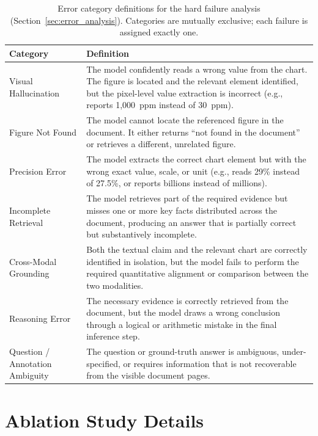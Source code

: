 \documentclass{article} %
\begin{document}
\begin{table}[htbp]
\centering
\footnotesize
\caption{%
  Error category definitions for the hard failure analysis
  (Section~\ref{sec:error_analysis}).
  Categories are mutually exclusive; each failure is assigned exactly one.
}
\label{tab:error_categories_app}
\begin{tabular}{@{}lp{9cm}@{}}
\toprule
\textbf{Category} & \textbf{Definition} \\
\midrule
Visual Hallucination &
  The model confidently reads a wrong value from the chart.
  The figure is located and the relevant element identified, but the
  pixel-level value extraction is incorrect (e.g., reports 1{,}000~ppm instead of 30~ppm). \\[4pt]
Figure Not Found &
  The model cannot locate the referenced figure in the document.
  It either returns ``not found in the document'' or retrieves a different, unrelated figure. \\[4pt]
Precision Error &
  The model extracts the correct chart element but with the wrong exact value, scale,
  or unit (e.g., reads 29\% instead of 27.5\%, or reports billions instead of millions). \\[4pt]
Incomplete Retrieval &
  The model retrieves part of the required evidence but misses one or more key facts
  distributed across the document, producing an answer that is partially correct but
  substantively incomplete. \\[4pt]
Cross-Modal Grounding &
  Both the textual claim and the relevant chart are correctly identified in isolation,
  but the model fails to perform the required quantitative alignment or comparison
  between the two modalities. \\[4pt]
Reasoning Error &
  The necessary evidence is correctly retrieved from the document, but the model draws
  a wrong conclusion through a logical or arithmetic mistake in the final inference step. \\[4pt]
Question / Annotation Ambiguity &
  The question or ground-truth answer is ambiguous, under-specified, or requires
  information that is not recoverable from the visible document pages. \\
\bottomrule
\end{tabular}
\end{table}

\FloatBarrier
\section{Ablation Study Details}
\label{app:ablation_details}
\end{document}
